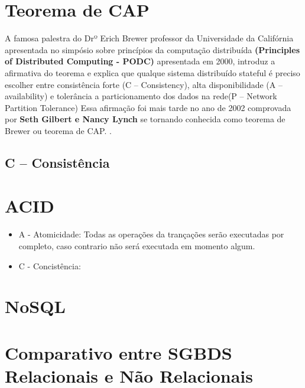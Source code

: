 \section{Teorema de CAP}
A famosa palestra do Drº Erich Brewer professor da Universidade da Califórnia apresentada no simpósio sobre princípios da computação distribuída \textbf{ (Principles of Distributed Computing - PODC) } 
apresentada em 2000, introduz a afirmativa do teorema e explica que qualque sistema distribuído stateful é preciso escolher entre consistência forte (C – Consistency), alta disponibilidade (A – availability) e tolerância a particionamento dos dados na rede(P – Network Partition Tolerance)
Essa afirmação foi mais tarde no ano de 2002 comprovada por \textbf{ Seth Gilbert e Nancy Lynch } se tornando conhecida como teorema de Brewer ou teorema de CAP. \cite{BREWER}.

\subsection{C – Consistência }

\section{ACID}
  \begin{itemize}
    \item{ A - Atomicidade:
      Todas as operações da trançações serão executadas por completo, caso contrario não será executada em momento algum.
    }
    
    \item{ C - Concistência:
      
    }
  \end{itemize}

\section{NoSQL}

\section{Comparativo entre SGBDS Relacionais e Não Relacionais}
